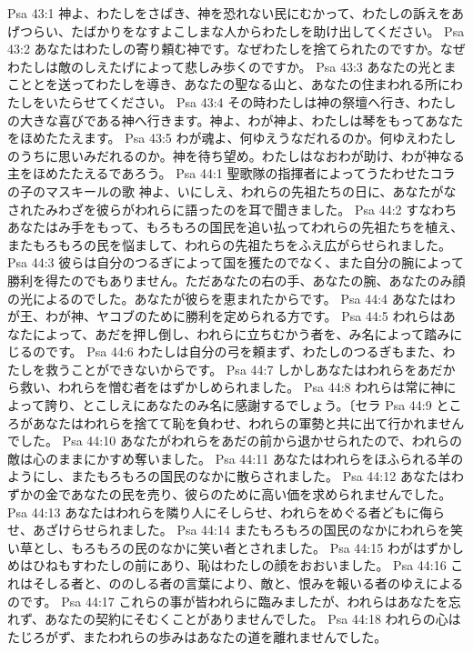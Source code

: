Psa 43:1  神よ、わたしをさばき、神を恐れない民にむかって、わたしの訴えをあげつらい、たばかりをなすよこしまな人からわたしを助け出してください。
Psa 43:2  あなたはわたしの寄り頼む神です。なぜわたしを捨てられたのですか。なぜわたしは敵のしえたげによって悲しみ歩くのですか。
Psa 43:3  あなたの光とまこととを送ってわたしを導き、あなたの聖なる山と、あなたの住まわれる所にわたしをいたらせてください。
Psa 43:4  その時わたしは神の祭壇へ行き、わたしの大きな喜びである神へ行きます。神よ、わが神よ、わたしは琴をもってあなたをほめたたえます。
Psa 43:5  わが魂よ、何ゆえうなだれるのか。何ゆえわたしのうちに思いみだれるのか。神を待ち望め。わたしはなおわが助け、わが神なる主をほめたたえるであろう。
Psa 44:1  聖歌隊の指揮者によってうたわせたコラの子のマスキールの歌 神よ、いにしえ、われらの先祖たちの日に、あなたがなされたみわざを彼らがわれらに語ったのを耳で聞きました。
Psa 44:2  すなわちあなたはみ手をもって、もろもろの国民を追い払ってわれらの先祖たちを植え、またもろもろの民を悩まして、われらの先祖たちをふえ広がらせられました。
Psa 44:3  彼らは自分のつるぎによって国を獲たのでなく、また自分の腕によって勝利を得たのでもありません。ただあなたの右の手、あなたの腕、あなたのみ顔の光によるのでした。あなたが彼らを恵まれたからです。
Psa 44:4  あなたはわが王、わが神、ヤコブのために勝利を定められる方です。
Psa 44:5  われらはあなたによって、あだを押し倒し、われらに立ちむかう者を、み名によって踏みにじるのです。
Psa 44:6  わたしは自分の弓を頼まず、わたしのつるぎもまた、わたしを救うことができないからです。
Psa 44:7  しかしあなたはわれらをあだから救い、われらを憎む者をはずかしめられました。
Psa 44:8  われらは常に神によって誇り、とこしえにあなたのみ名に感謝するでしょう。〔セラ
Psa 44:9  ところがあなたはわれらを捨てて恥を負わせ、われらの軍勢と共に出て行かれませんでした。
Psa 44:10  あなたがわれらをあだの前から退かせられたので、われらの敵は心のままにかすめ奪いました。
Psa 44:11  あなたはわれらをほふられる羊のようにし、またもろもろの国民のなかに散らされました。
Psa 44:12  あなたはわずかの金であなたの民を売り、彼らのために高い価を求められませんでした。
Psa 44:13  あなたはわれらを隣り人にそしらせ、われらをめぐる者どもに侮らせ、あざけらせられました。
Psa 44:14  またもろもろの国民のなかにわれらを笑い草とし、もろもろの民のなかに笑い者とされました。
Psa 44:15  わがはずかしめはひねもすわたしの前にあり、恥はわたしの顔をおおいました。
Psa 44:16  これはそしる者と、ののしる者の言葉により、敵と、恨みを報いる者のゆえによるのです。
Psa 44:17  これらの事が皆われらに臨みましたが、われらはあなたを忘れず、あなたの契約にそむくことがありませんでした。
Psa 44:18  われらの心はたじろがず、またわれらの歩みはあなたの道を離れませんでした。
